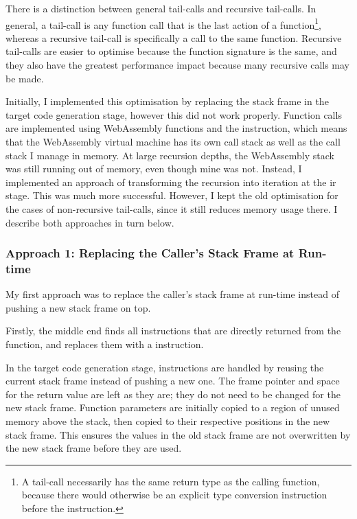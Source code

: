 \documentclass[00-main.tex]{subfiles}
\begin{document}
There is a distinction between general tail-calls and recursive tail-calls. In general, a tail-call is any function call that is the last action of a function\footnote{A tail-call necessarily has the same return type as the calling function, because there would otherwise be an explicit type conversion instruction before the  instruction.}, whereas a recursive tail-call is specifically a call to the same function.
Recursive tail-calls are easier to optimise because the function signature is the same, and they also have the greatest performance impact because many recursive calls may be made.

Initially, I implemented this optimisation by replacing the stack frame in the target code generation stage, however this did not work properly.
Function calls are implemented using WebAssembly functions and the  instruction, which means that the WebAssembly virtual machine has its own call stack as well as the call stack I manage in memory.
At large recursion depths, the WebAssembly stack was still running out of memory, even though mine was not.
Instead, I implemented an approach of transforming the recursion into iteration at the \gls{ir} stage.
This was much more successful.
However, I kept the old optimisation for the cases of non-recursive tail-calls, since it still reduces memory usage there.
I describe both approaches in turn below.

\subsubsection{Approach 1: Replacing the Caller's Stack Frame at Run-time}

My first approach was to replace the caller's stack frame at run-time instead of pushing a new stack frame on top.

Firstly, the middle end finds all  instructions that are directly returned from the function, and replaces them with a  instruction.

In the target code generation stage,  instructions are handled by reusing the current stack frame instead of pushing a new one.
The frame pointer and space for the return value are left as they are; they do not need to be changed for the new stack frame.
Function parameters are initially copied to a region of unused memory above the stack, then copied to their respective positions in the new stack frame. This ensures the values in the old stack frame are not overwritten by the new stack frame before they are used.
\end{document}
